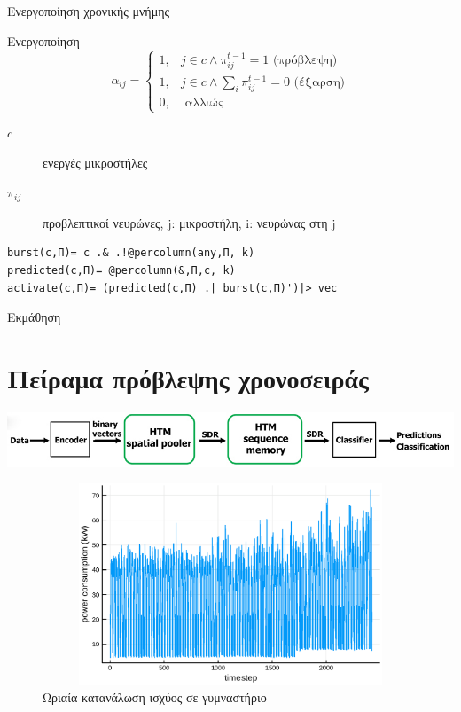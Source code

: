 \documentclass[10pt,lualatex]{beamer}
\begin{document}
\begin{frame}[fragile]{Ενεργοποίηση χρονικής μνήμης}
\begin{block}{Ενεργοποίηση}
  \begin{equation}
    α_{ij}= \begin{cases} 1, &j \in c \wedge π_{ij}^{t-1}=1 \text{ (πρόβλεψη)}\\
                          1, &j \in c \wedge \sum_i π_{ij}^{t-1}=0 \text{ (έξαρση)}\\
                          0, &\text{ αλλιώς}
            \end{cases}
  \end{equation}
  \begin{description}
    \item[$c$] ενεργές μικροστήλες
    \item[$π_{ij}$] προβλεπτικοί νευρώνες, j: μικροστήλη, i: νευρώνας στη j
  \end{description}
\end{block}
\begin{verbatim}
burst(c,Π)= c .& .!@percolumn(any,Π, k)
predicted(c,Π)= @percolumn(&,Π,c, k)
activate(c,Π)= (predicted(c,Π) .| burst(c,Π)')|> vec
\end{verbatim}
\end{frame}

\begin{frame}{Εκμάθηση}
\end{frame}

\section{Πείραμα πρόβλεψης χρονοσειράς}

\begin{frame}
  \centering
  \includegraphics[width=\textwidth]{../figures/htm_predict_pipeline}
  \pause
  \begin{figure}
    \includegraphics[width=1.05\textwidth,height=6cm]{../figures/tshotgym}
    \caption{Ωριαία κατανάλωση ισχύος σε γυμναστήριο}
  \end{figure}
\end{frame}
\end{document}
